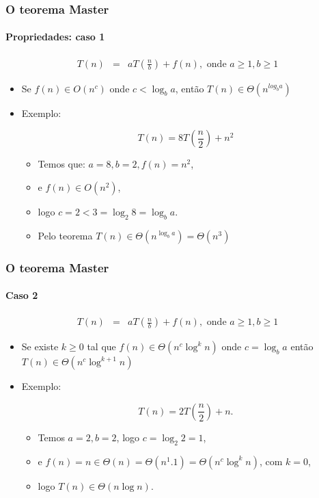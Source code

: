 \documentclass[handout]{beamer}
\begin{document}
\begin{frame}
\frametitle{O teorema Master}
\framesubtitle{Propriedades: caso 1}

\begin{eqnarray*}
T(n) & = & a T(\frac{n}{b}) + f(n), \mbox{ onde $a \ge 1, b \ge 1$}
\end{eqnarray*}

\begin{itemize}

\item Se $f(n) \in O(n^{c})$ onde $c < \log_{b} a$, 
  então $T(n) \in \Theta(n^{log_{b} a})$

\item Exemplo: 

$$T(n) = 8T(\frac{n}{2}) + n^{2}$$

\pause
  
\begin{itemize}

  \item Temos que: $a = 8, b = 2, f(n) = n^2$,

  \item e $f(n) \in O(n^{2})$,

  \item logo $c = 2 < 3 = \log_{2} 8 = \log_{b} a.$

  \item Pelo teorema $T(n) \in \Theta(n^{\log_{b} a}) = \Theta(n^3)$

\end{itemize}

\end{itemize}

\end{frame}

\begin{frame}
\frametitle{O teorema Master}
\framesubtitle{Caso 2}

\begin{eqnarray*}
T(n) & = & a T(\frac{n}{b}) + f(n), \mbox{ onde $a \ge 1, b \ge 1$}
\end{eqnarray*}

\begin{itemize}

\item Se existe $k \ge 0$ tal que $f(n) \in \Theta(n^{c} \log^{k} n)$ onde
  $c = \log_b a$ então $T(n) \in \Theta(n^{c} \log^{k+1} n)$

\item Exemplo:

$$
T(n) = 2T(\frac{n}{2}) + n.
$$

\pause

\begin{itemize}
\item Temos $a = 2, b = 2$, logo $c = \log_{2} 2 = 1$,
\item e $f(n) = n \in \Theta(n) = \Theta(n^{1}.1) = \Theta(n^{c} \log^{k} n)$, com $k = 0$,
\item logo $T(n) \in \Theta(n \log n)$.
\end{itemize}
\end{itemize}

\end{frame}
\end{document}

